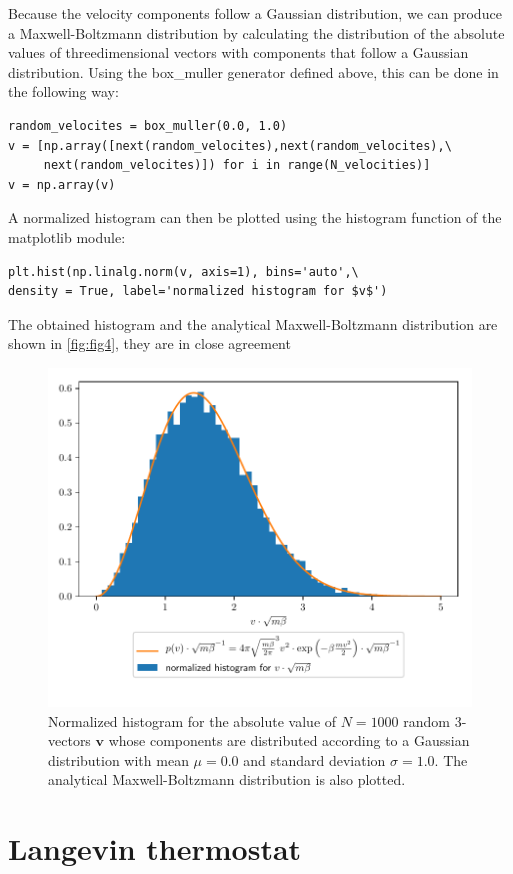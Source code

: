 \documentclass[a4paper,10pt,bibtotoc]{scrartcl}
\begin{document}
Because the velocity components follow a Gaussian distribution, we can produce a Maxwell-Boltzmann distribution by calculating the distribution of the absolute values of threedimensional vectors with components that follow a Gaussian distribution.
Using the box\_muller generator defined above, this can be done in the following way:
\begin{lstlisting}
random_velocites = box_muller(0.0, 1.0)
v = [np.array([next(random_velocites),next(random_velocites),\
     next(random_velocites)]) for i in range(N_velocities)] 
v = np.array(v)
\end{lstlisting}
A normalized histogram can then be plotted using the histogram function of the matplotlib module:
\begin{lstlisting}
plt.hist(np.linalg.norm(v, axis=1), bins='auto',\
density = True, label='normalized histogram for $v$')
\end{lstlisting}
The obtained histogram and the analytical Maxwell-Boltzmann distribution are shown in \autoref{fig:fig4}, they are in close agreement
\begin{figure}[H]
	\centering
	\includegraphics[width=\linewidth]{maxwell_boltzmann.pdf}
	\caption{Normalized histogram for the absolute value of $N=1000$ random 3-vectors $\mathbf{v}$ whose components are distributed according to a Gaussian distribution with mean $\mu=0.0$ and standard deviation $\sigma = 1.0$. The analytical Maxwell-Boltzmann distribution is also plotted.}
	\label{fig:fig4}
\end{figure}

\section{Langevin thermostat}
\end{document}
